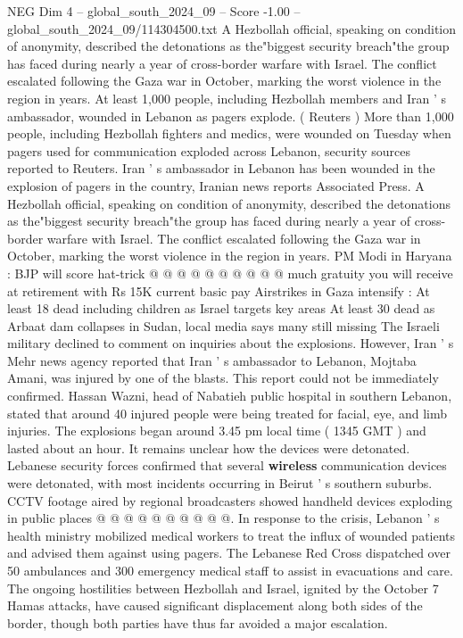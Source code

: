 \begin{textsample}{NEG Dim 4 – global\_south\_2024\_09 – Score -1.00 – global\_south\_2024\_09/114304500.txt}  \label{ex:f4_neg_161}
A Hezbollah official, speaking on condition of anonymity, described the detonations as the"biggest security breach"the group has faced during nearly a year of cross-border warfare with Israel.
The conflict escalated following the Gaza war in October, marking the worst violence in the region in years.
At least 1,000 people, including Hezbollah members and Iran ' s ambassador, wounded in Lebanon as pagers explode. ( Reuters ) More than 1,000 people, including Hezbollah fighters and medics, were wounded on Tuesday when pagers used for communication exploded across Lebanon, security sources reported to Reuters.
Iran ' s ambassador in Lebanon has been wounded in the explosion of pagers in the country, Iranian news reports Associated Press.
A Hezbollah official, speaking on condition of anonymity, described the detonations as the"biggest security breach"the group has faced during nearly a year of cross-border warfare with Israel.
The conflict escalated following the Gaza war in October, marking the worst violence in the region in years.
PM Modi in Haryana : BJP will score hat-trick @ @ @ @ @ @ @ @ @ @ much gratuity you will receive at retirement with Rs 15K current basic pay Airstrikes in Gaza intensify : At least 18 dead including children as Israel targets key areas At least 30 dead as Arbaat dam collapses in Sudan, local media says many still missing The Israeli military declined to comment on inquiries about the explosions.
However, Iran ' s Mehr news agency reported that Iran ' s ambassador to Lebanon, Mojtaba Amani, was injured by one of the blasts.
This report could not be immediately confirmed.
Hassan Wazni, head of Nabatieh public hospital in southern Lebanon, stated that around 40 injured people were being treated for facial, eye, and limb injuries.
The explosions began around 3.45 pm local time ( 1345 GMT ) and lasted about an hour.
It remains unclear how the devices were detonated.
Lebanese security forces confirmed that several \textbf{wireless} communication devices were detonated, with most incidents occurring in Beirut ' s southern suburbs.
CCTV footage aired by regional broadcasters showed handheld devices exploding in public places @ @ @ @ @ @ @ @ @ @.
In response to the crisis, Lebanon ' s health ministry mobilized medical workers to treat the influx of wounded patients and advised them against using pagers.
The Lebanese Red Cross dispatched over 50 ambulances and 300 emergency medical staff to assist in evacuations and care.
The ongoing hostilities between Hezbollah and Israel, ignited by the October 7 Hamas attacks, have caused significant displacement along both sides of the border, though both parties have thus far avoided a major escalation.

\end{textsample}
